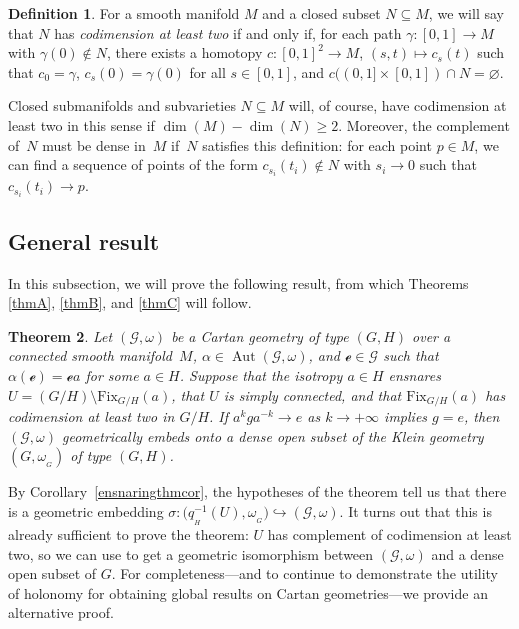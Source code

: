 \documentclass[pdftex]{sigma}
\numberwithin{equation}{section}
\newtheorem{Theorem}{Theorem}[section]
\theoremstyle{definition}
\newtheorem{Definition}[Theorem]{Definition}
\DeclareMathOperator{\Aut}{\mathrm{Aut}}
\newcommand{\MC}[1]{\omega_{{}_{#1}}}
\begin{document}
\begin{Definition}For a smooth manifold $M$ and a closed subset $N\subseteq M$, we will say that $N$ has \emph{codimension at least two} if and only if, for each path $\gamma \colon [0,1]\to M$ with $\gamma(0)\not\in N$, there exists a homotopy $c\colon [0,1]^2\to M$, $(s,t)\mapsto c_s(t)$ such that $c_0=\gamma$, $c_s(0)=\gamma(0)$ for all $s\in[0,1]$, and $c((0,1]\times[0,1])\cap N=\varnothing$.\end{Definition}

Closed submanifolds and subvarieties $N\subseteq M$ will, of course, have codimension at least two in this sense if $\dim(M)-\dim(N)\geq 2$. Moreover, the complement of~$N$ must be dense in~$M$ if~$N$ satisfies this definition: for each point $p\in M$, we can find a sequence of points of the form $c_{s_i}(t_i)\not\in N$ with $s_i\rightarrow 0$ such that $c_{s_i}(t_i)\rightarrow p$.

\subsection{General result}
In this subsection, we will prove the following result, from which Theorems \ref{thmA}, \ref{thmB}, and \ref{thmC} will follow.

\begin{Theorem}\label{ensnaringthm+} Let $(\mathscr{G},\omega)$ be a Cartan geometry of type $(G,H)$ over a connected smooth mani\-fold~$M$, $\alpha\in\Aut(\mathscr{G},\omega)$, and $\mathscr{e}\in\mathscr{G}$ such that $\alpha(\mathscr{e})=\mathscr{e}a$ for some $a\in H$. Suppose that the isotropy $a\in H$ ensnares $U=(G/H)\setminus\mathrm{Fix}_{G/H}(a)$, that $U$ is simply connected, and that $\mathrm{Fix}_{G/H}(a)$ has codimension at least two in $G/H$. If $a^kga^{-k}\rightarrow e$ as $k\rightarrow +\infty$ implies $g=e$, then $(\mathscr{G},\omega)$ geometrically embeds onto a dense open subset of the Klein geometry $(G,\MC{G})$ of type $(G,H)$.\end{Theorem}

By Corollary~\ref{ensnaringthmcor}, the hypotheses of the theorem tell us that there is a geometric embedding $\sigma\colon \bigl(q_{{}_H}^{-1}(U),\MC{G}\bigr)\hookrightarrow (\mathscr{G},\omega)$. It turns out that this is already sufficient to prove the theorem: $U$ has complement of codimension at least two, so we can use \cite[Theorem~1.8]{Frances2008} to get a geometric isomorphism between $(\mathscr{G},\omega)$ and a dense open subset of $G$. For completeness---and to continue to demonstrate the utility of holonomy for obtaining global results on Cartan geometries---we provide an alternative proof.
\end{document}
